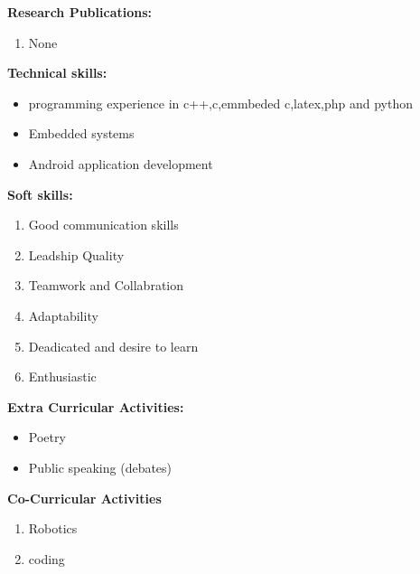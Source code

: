 \documentclass[10pt,a4paper]{article}
\begin{document}
\begin{flushleft}
	\textbf{Research Publications:}
	\begin{enumerate}
		\item None\\ \medskip
	\end{enumerate} 
	\textbf{Technical skills:}\\
	\begin{itemize}
		\item programming experience in c++,c,emmbeded c,latex,php and python\\
		\item  Embedded systems\\
		\item  Android application development\\
	\end{itemize}
	\textbf{Soft skills:}\\
	\begin{enumerate}
		\item Good communication skills\\
		\item Leadship Quality\\
		\item Teamwork and Collabration\\
		\item Adaptability\\
		\item Deadicated and desire to learn\\
		\item Enthusiastic\\
		
	\end{enumerate}
	\textbf{Extra Curricular Activities:}\\
	
	\begin{itemize}
		\item Poetry\\
		\item Public speaking (debates)\\
		
	\end{itemize}
	
		
		
	\textbf{ \linebreak Co-Curricular Activities}
		\begin{enumerate}
			\item Robotics\\
			\item coding	
		\end{enumerate}
	

\end{flushleft}
\end{document}
